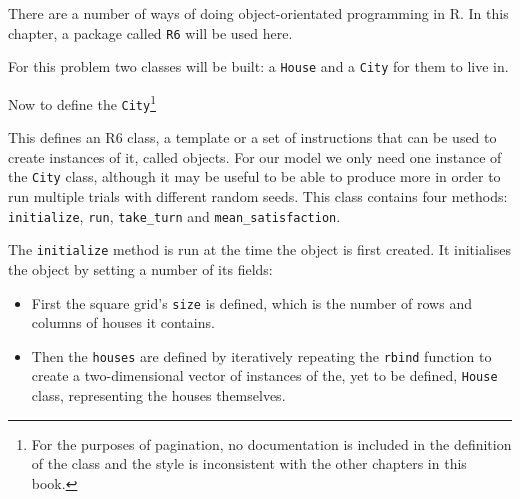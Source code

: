 There are a number of ways of doing object-orientated programming in R.
In this chapter, a package called \texttt{R6} will be used here.

For this problem two classes will be built: a
\texttt{House} and a \texttt{City} for them to live in.

Now to define the \texttt{City}\footnote{
For the purposes of pagination, no documentation is included in the definition
of the class and the style is inconsistent with the other chapters in this book.
}


This defines an R6 class, a template or a set of instructions that can be used
to create instances of it, called objects.
For our model we only need one instance of the \texttt{City} class,
although it may be useful to be able to produce more in order to run multiple
trials with different random seeds.
This class contains four methods: \texttt{initialize},
\texttt{run}, \texttt{take_turn} and
\texttt{mean_satisfaction}.

The \texttt{initialize} method is run at the time the object is first
created.
It initialises the object by setting a number of its fields:

\begin{itemize}
     \item First the square grid's \texttt{size} is defined, which
           is the number of rows and columns of houses it contains.
     \item Then the \texttt{houses} are defined by iteratively repeating
           the \texttt{rbind} function to create a two-dimensional vector
           of instances of the, yet to be defined, \texttt{House} class,
           representing the houses themselves.
\end{itemize}

